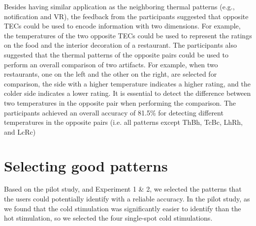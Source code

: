 \documentclass[preprint,12pt]{elsarticle}
\begin{document}

Besides having similar application as the neighboring thermal patterns (e.g., notification and VR), the feedback from the participants suggested that opposite TECs could be used to encode information with two dimensions. For example, the temperatures of the two opposite TECs could be used to represent the ratings on the food and the interior decoration of a restaurant. The participants also suggested that the thermal patterns of the opposite pairs could be used to perform an overall comparison of two artifacts. For example, when two restaurants, one on the left and the other on the right, are selected for comparison, the side with a higher temperature indicates a higher rating, and the colder side indicates a lower rating. It is essential to detect the difference between two temperatures in the opposite pair when performing the comparison. The participants achieved an overall accuracy of 81.5\% for detecting different temperatures in the opposite pairs (i.e. all patterns except ThBh, TcBc, LhRh, and LcRc)


\section{Selecting good patterns}
Based on the pilot study, and Experiment 1 \& 2, we selected the patterns that the users could potentially identify with a reliable accuracy. In the pilot study, as we found that the cold stimulation was significantly easier to identify than the hot stimulation, so we selected the four single-spot cold stimulations.
\end{document}
